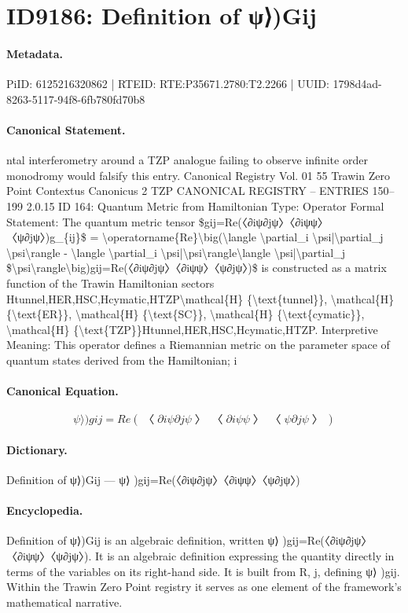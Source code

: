 \section*{ID9186: Definition of ψ⟩)Gij}
\paragraph{Metadata.}
PiID: 6125216320862 | RTEID: RTE:P35671.2780:T2.2266 | UUID: 1798d4ad-8263-5117-94f8-6fb780fd70b8

\paragraph{Canonical Statement.}
ntal interferometry around a TZP analogue failing to observe infinite order monodromy would falsify this entry. Canonical Registry Vol. 01 55 Trawin Zero Point Contextus Canonicus 2 TZP CANONICAL REGISTRY – ENTRIES 150–199 2.0.15 ID 164: Quantum Metric from Hamiltonian Type: Operator Formal Statement: The quantum metric tensor \$gij=Re(〈∂iψ∂jψ〉〈∂iψψ〉〈ψ∂jψ〉)g\_\{ij\}\$ = \textbackslash{}operatorname\{Re\}\textbackslash{}big(\textbackslash{}langle \textbackslash{}partial\_i \textbackslash{}psi|\textbackslash{}partial\_j \textbackslash{}psi\textbackslash{}rangle - \textbackslash{}langle \textbackslash{}partial\_i \textbackslash{}psi|\textbackslash{}psi\textbackslash{}rangle\textbackslash{}langle \textbackslash{}psi|\textbackslash{}partial\_j \$\textbackslash{}psi\textbackslash{}rangle\textbackslash{}big)gij=Re(〈∂iψ∂jψ〉〈∂iψψ〉〈ψ∂jψ〉)\$ is constructed as a matrix function of the Trawin Hamiltonian sectors Htunnel,HER,HSC,Hcymatic,HTZP\textbackslash{}mathcal\{H\} \{\textbackslash{}text\{tunnel\}\}, \textbackslash{}mathcal\{H\} \{\textbackslash{}text\{ER\}\}, \textbackslash{}mathcal\{H\} \{\textbackslash{}text\{SC\}\}, \textbackslash{}mathcal\{H\} \{\textbackslash{}text\{cymatic\}\}, \textbackslash{}mathcal\{H\} \{\textbackslash{}text\{TZP\}\}Htunnel,HER,HSC,Hcymatic,HTZP. Interpretive Meaning: This operator defines a Riemannian metric on the parameter space of quantum states derived from the Hamiltonian; i

\paragraph{Canonical Equation.}
\[
\psi\rangle\big)gij=Re(〈∂iψ∂jψ〉〈∂iψψ〉〈ψ∂jψ〉)
\]

\paragraph{Dictionary.}
Definition of ψ⟩)Gij — ψ⟩ )gij=Re(〈∂iψ∂jψ〉〈∂iψψ〉〈ψ∂jψ〉)

\paragraph{Encyclopedia.}
Definition of ψ⟩)Gij is an algebraic definition, written ψ⟩ )gij=Re(〈∂iψ∂jψ〉〈∂iψψ〉〈ψ∂jψ〉). It is an algebraic definition expressing the quantity directly in terms of the variables on its right-hand side. It is built from R, j, defining ψ⟩ )gij. Within the Trawin Zero Point registry it serves as one element of the framework's mathematical narrative.
